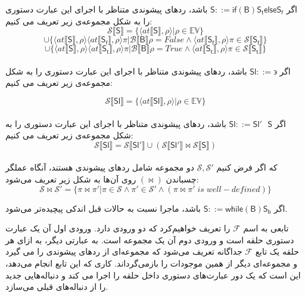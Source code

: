 \begin{defn}
	
	اگر $         \mathsf{S} ::= \mathsf{if}  \mathsf{ (B) S_t else S_f}  $ باشد، ردهای پیشوندی متناظر با اجرای این عبارت‌ دستوری را به شکل مجموعه‌ی زیر تعریف می کنیم:
	$$\mathcal{S} \llbracket\mathsf{S}\rrbracket = \{ \langle at\llbracket\mathsf{S}\rrbracket , \rho \rangle | \rho \in \mathbb{EV}       \} $$$$\cup     \{ \langle at\llbracket\mathsf{S}\rrbracket , \rho \rangle \langle at\llbracket\mathsf{S_f}\rrbracket , \rho \rangle 
	\pi | \mathcal{B}\llbracket\mathsf{B}\rrbracket \rho =False  \wedge   \langle  at\llbracket\mathsf{S_f}\rrbracket  , \rho \rangle \pi \in \mathcal{S} \llbracket\mathsf{S_f}\rrbracket    \}  
	$$$$\cup    \{ \langle at\llbracket\mathsf{S}\rrbracket , \rho \rangle \langle at\llbracket\mathsf{S_t}\rrbracket , \rho \rangle 
	\pi | \mathcal{B}\llbracket\mathsf{B}\rrbracket \rho =True  \wedge   \langle  at\llbracket\mathsf{S_t}\rrbracket  , \rho \rangle \pi \in \mathcal{S} \llbracket\mathsf{S_t}\rrbracket    \}          $$ \\
	
	
	اگر 
	$         \mathsf{Sl} ::= \backepsilon  $
	باشد، ردهای پیشوندی متناظر با اجرای این عبارت‌ دستوری را به شکل مجموعه‌ی زیر تعریف می کنیم:
	
	$$\mathcal{S} \llbracket\mathsf{Sl}\rrbracket = \{ \langle at\llbracket\mathsf{Sl}\rrbracket , \rho \rangle | \rho \in \mathbb{EV}       \}        $$ \\
	
	اگر $         \mathsf{Sl} ::= \mathsf{Sl' \:\:\: S}  $ باشد، ردهای پیشوندی متناظر با اجرای این عبارت‌ دستوری را به شکل مجموعه‌ی زیر تعریف می کنیم:
	$$\mathcal{S} \llbracket\mathsf{Sl}\rrbracket = \mathcal{S} \llbracket\mathsf{Sl'}\rrbracket \cup( \mathcal{S} \llbracket\mathsf{Sl'}\rrbracket
	\Join \mathcal{S} \llbracket\mathsf{S}\rrbracket )      $$ \\
	که اگر فرض کنیم 
	$\mathcal{S,S'}$
	دو مجموعه شامل ردهای پیشوندی هستند، آنگاه عملگر چسباندن 
	$(\Join)$
	روی آن‌ها به شکل زیر تعریف می‌شود:
	$$\mathcal{S}\Join \mathcal{S}' = \{\pi \Join \pi' | \pi \in \mathcal{S}\land\pi' \in \mathcal{S}'\land (\pi \Join \pi'\;is\; well-defined) \}$$
	
	
	اگر $         \mathsf{S} ::= \mathsf{while (B)S_b }   $ باشد، ماجرا نسبت به حالات قبل اندکی پیچیده‌تر می‌شود.
	
	تابعی به اسم $\mathcal{F} $ را تعریف خواهیم‌کرد که دو ورودی دارد. ورودی اول آن یک عبارت‌ دستوری حلقه است و ورودی دوم آن یک مجموعه است. به عبارتی دیگر، به ازای هر حلقه یک تابع $\mathcal{F} $  جداگانه تعریف می‌شود که مجموعه‌ای از ردهای پیشوندی را می گیرد و مجموعه‌ای دیگر از همین موجودات را بازمی‌گرداند. کاری که این تابع انجام می‌دهد، این است که یک دور عبارت‌های دستوری داخل حلقه را اجرا می کند و دنباله‌هایی جدید را از دنباله‌های قبلی می‌سازد. 
	

\end{defn}
